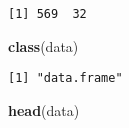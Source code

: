 \documentclass[
]{article}
\newenvironment{Shaded}{\begin{snugshade}}{\end{snugshade}}
\newcommand{\KeywordTok}[1]{\textcolor[rgb]{0.13,0.29,0.53}{\textbf{#1}}}
\newcommand{\NormalTok}[1]{#1}
\begin{document}
\begin{verbatim}
[1] 569  32
\end{verbatim}

\begin{Shaded}
\begin{Highlighting}[]
\KeywordTok{class}\NormalTok{(data)}
\end{Highlighting}
\end{Shaded}

\begin{verbatim}
[1] "data.frame"
\end{verbatim}

\begin{Shaded}
\begin{Highlighting}[]
\KeywordTok{head}\NormalTok{(data)}
\end{Highlighting}
\end{Shaded}
\end{document}
